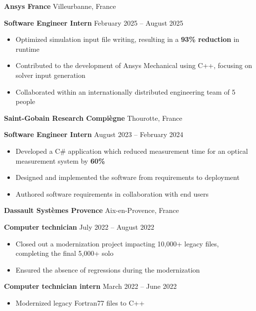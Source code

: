 \documentclass[11pt]{article}
\begin{document}
\vspace{6pt}


\textbf{Ansys France} \hfill Villeurbanne, France

\textbf{Software Engineer Intern} \hfill February 2025 – August 2025
\begin{itemize}[noitemsep, topsep=0pt, partopsep=0pt, parsep=0pt]
    \item Optimized simulation input file writing, resulting in a \textbf{93\% reduction} in runtime
    \item Contributed to the development of Ansys Mechanical using C++, focusing on solver input generation
    \item Collaborated within an internationally distributed engineering team of 5 people
\end{itemize}

\vspace{6pt}

\textbf{Saint-Gobain Research Compiègne} \hfill Thourotte, France

\textbf{Software Engineer Intern} \hfill August 2023 – February 2024
\begin{itemize}[noitemsep, topsep=0pt, partopsep=0pt, parsep=0pt]
    \item Developed a C\# application which reduced measurement time for an 
 optical measurement system by \textbf{60\%} 
    \item Designed and implemented the software from requirements to deployment
    \item Authored software requirements in collaboration with end users
\end{itemize}

\vspace{6pt}

\textbf{Dassault Systèmes Provence} \hfill Aix-en-Provence, France

\textbf{Computer technician} \hfill July 2022 – August 2022
\begin{itemize}[noitemsep, topsep=0pt, partopsep=0pt, parsep=0pt]
    \item Closed out a modernization project impacting 10,000+ legacy files, completing the final 5,000+ solo
    \item Ensured the absence of regressions during the modernization

\end{itemize}

\textbf{Computer technician intern} \hfill March 2022 – June 2022
\begin{itemize}[noitemsep, topsep=0pt, partopsep=0pt, parsep=0pt]
    \item Modernized legacy Fortran77 files to C++

\end{itemize}
\end{document}
